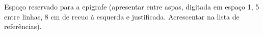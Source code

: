 \begin{epigrafe}
 \vspace*{20cm}
\noindent\hspace{8cm} %
\begin{minipage}{8cm} %
    {\setlength{\baselineskip}{1.5\baselineskip} %
    \noindent %
    {Espaço reservado para a epígrafe (apresentar entre aspas, digitada em espaço 1, 5 entre linhas, 8 cm de recuo à esquerda e justificada.  Acrescentar na lista de referências).}}
\end{minipage}
\end{epigrafe}
